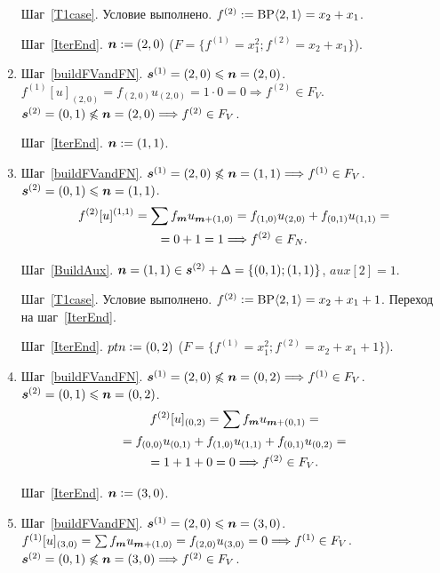 \documentclass[14pt]{extarticle}
\begin{document}
\begin{enumerate}
		Шаг~\ref{T1case}. Условие выполнено. $f^{(2)} := \mathop{\mathrm{BP}}\nolimits\langle2, 1\rangle = x_2 + x_1$.
		
		Шаг~\ref{IterEnd}. $\boldsymbol{n} := (2,0)$ ($F = \{f^{(1)} = x_1^2; f^{(2)} 
		= x_2  + x_1\}$).
		
		\item
		Шаг~\ref{buildFVandFN}. $\boldsymbol{s}^{(1)}=(2,0) \leqslant \boldsymbol{n} = (2,0)$.\\
		$f^{(1)}[u]_{(2,0)} = f_{(2,0)}u_{(2,0)} = 1\cdot 0=0 \Longrightarrow 
		f^{(2)}\in F_V$.\\
		$\boldsymbol{s}^{(2)} = (0,1) \not\leqslant \boldsymbol{n}=(2,0)
		\Longrightarrow f^{(2)}\in F_V$.
		
		Шаг~\ref{IterEnd}. $\boldsymbol{n} := (1,1)$.
		
		\item
		Шаг~\ref{buildFVandFN}.
		$\boldsymbol{s}^{(1)} = (2,0) \not\leqslant \boldsymbol{n}=(1,1)
		\Longrightarrow f^{(1)}\in F_V$.\\
		$\boldsymbol{s}^{(2)} = (0,1) \leqslant \boldsymbol{n} = (1,1)$.
		\begin{multline*}
		f^{(2)}[u]^{(1,1)} = \sum f_{\boldsymbol{m}} u_{\boldsymbol{m} + (1,0)} = f_{(1,0)}
		u_{(2,0)} + f_{(0,1)}u_{(1,1)} = \\ = 0 + 1 =1 \Longrightarrow 
		f^{(2)}\in F_N.
		\end{multline*}
		
		Шаг~\ref{BuildAux}. $\boldsymbol{n} = (1,1) \in \boldsymbol{s}^{(2)} + \Delta = \{(0,1);
		(1,1)\}$, $aux[2] = 1$.
		
		Шаг~\ref{T1case}. Условие выполнено. $f^{(2)} \mathrel{\mathop:}= \mathop{\mathrm{BP}}\nolimits\langle2, 1\rangle = x_2 + 
		x_ 1 + 1$. Переход на шаг~\ref{IterEnd}.
		
		Шаг~\ref{IterEnd}. $pt n \mathrel{\mathop:}= (0,2)$ ($F = \{f^{(1)} = x_1^2; f^{(2)}
		= x_2  + x_1 + 1\}$).
		
		\item
		Шаг~\ref{buildFVandFN}. $\boldsymbol{s}^{(1)} = (2,0) \not\leqslant \boldsymbol{n} = (0,2)
		\Longrightarrow f^{(1)}\in F_V$.\\
		$\boldsymbol{s}^{(2)} = (0,1) \leqslant \boldsymbol{n} = (0,2)$.
		\begin{multline*}
			f^{(2)}[u]_{(0,2)} = \sum f_{\boldsymbol{m}}u_{\boldsymbol{m} + (0,1)} = \\
			= f_{(0,0)} u_{(0,1)} + f_{(1,0)} u_{(1,1)} + f_{(0,1)} u_{(0,2)}=\\
			= 1 + 1 + 0 = 0 \Longrightarrow f^{(2)}\in F_V.
		\end{multline*}
		
		Шаг~\ref{IterEnd}. $\boldsymbol{n} \mathrel{\mathop:}= (3,0)$.
		
		\item
		Шаг~\ref{buildFVandFN}. $\boldsymbol{s}^{(1)} = (2,0) \leqslant \boldsymbol{n} = (3,0)$.\\
		$f^{(1)}[u]_{(3,0)} = \sum f_{\boldsymbol{m}} u_{\boldsymbol{m} + (1,0)} = f_{(2,0)}
		u_{(3,0)} = 0 \Longrightarrow f^{(1)} \in F_V$.\\
		$\boldsymbol{s}^{(2)}=(0,1) \not\leqslant \boldsymbol{n}=(3,0)\Longrightarrow f^{(2)} \in F_V$.
		

\end{enumerate}
\end{document}
